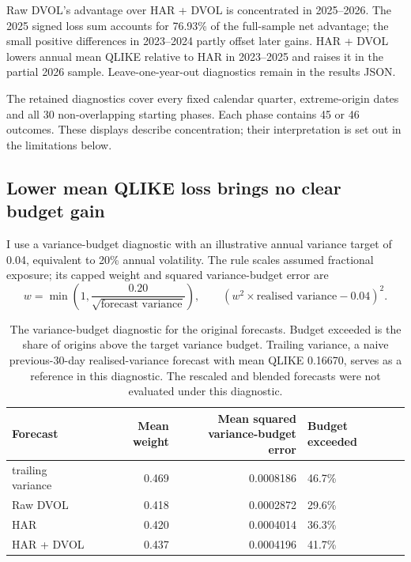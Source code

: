 \documentclass[10pt,a4paper]{article}
\newcommand{\Unit}{1}
\newcommand{\PowerTwo}{2}
\newcommand{\MonthlyDays}{30}
\newcommand{\MeanQLIKETrailing}{0.16670}
\newcommand{\LeaveYearAYear}{2023}
\newcommand{\LeaveYearBYear}{2024}
\newcommand{\LeaveYearCYear}{2025}
\newcommand{\LeaveYearDYear}{2026}
\newcommand{\NonoverlapPhases}{30}
\newcommand{\MinimumPhaseOutcomes}{45}
\newcommand{\MaximumPhaseOutcomes}{46}
\newcommand{\BudgetWeight}{0.20}
\newcommand{\BudgetVariance}{0.04}
\newcommand{\BudgetPercent}{20}
\newcommand{\DecisionTrailingWeight}{0.469}
\newcommand{\DecisionTrailingBudgetError}{0.0008186}
\newcommand{\DecisionTrailingBudgetExceededPercent}{46.7}
\newcommand{\DecisionDvolWeight}{0.418}
\newcommand{\DecisionDvolBudgetError}{0.0002872}
\newcommand{\DecisionDvolBudgetExceededPercent}{29.6}
\newcommand{\DecisionHarWeight}{0.420}
\newcommand{\DecisionHarBudgetError}{0.0004014}
\newcommand{\DecisionHarBudgetExceededPercent}{36.3}
\newcommand{\DecisionHardvolWeight}{0.437}
\newcommand{\DecisionHardvolBudgetError}{0.0004196}
\newcommand{\DecisionHardvolBudgetExceededPercent}{41.7}
\newcommand{\RawGainYearShare}{76.93}
\begin{document}
Raw DVOL's advantage over HAR + DVOL is concentrated in \LeaveYearCYear{}--\LeaveYearDYear{}. The \LeaveYearCYear{} signed loss sum accounts for \RawGainYearShare{}\% of the full-sample net advantage; the small positive differences in \LeaveYearAYear{}--\LeaveYearBYear{} partly offset later gains. HAR + DVOL lowers annual mean QLIKE relative to HAR in \LeaveYearAYear{}--\LeaveYearCYear{} and raises it in the partial \LeaveYearDYear{} sample. Leave-one-year-out diagnostics remain in the results JSON.

The retained diagnostics cover every fixed calendar quarter, extreme-origin dates and all \NonoverlapPhases{} non-overlapping starting phases. Each phase contains \MinimumPhaseOutcomes{} or \MaximumPhaseOutcomes{} outcomes. These displays describe concentration; their interpretation is set out in the limitations below.

\subsection{Lower mean QLIKE loss brings no clear budget gain}

I use a variance-budget diagnostic with an illustrative annual variance target of \BudgetVariance{}, equivalent to \BudgetPercent{}\% annual volatility. The rule scales assumed fractional exposure; its capped weight and squared variance-budget error are
\[
w=\min\!\left(\Unit{},\frac{\BudgetWeight{}}{\sqrt{\text{forecast variance}}}\right),
\qquad
\left(w^{\PowerTwo{}}\times\text{realised variance}-\BudgetVariance{}\right)^{\PowerTwo{}}.
\]

\begin{table}[H]
\centering\small
\caption{The variance-budget diagnostic for the original forecasts. Budget exceeded is the share of origins above the target variance budget. Trailing variance, a naive previous-\MonthlyDays{}-day realised-variance forecast with mean QLIKE \MeanQLIKETrailing{}, serves as a reference in this diagnostic. The rescaled and blended forecasts were not evaluated under this diagnostic.}
\label{tab:budget}
\begin{tabular}{lrrl}
\toprule
Forecast & Mean weight & \shortstack{Mean squared\\variance-budget error} & Budget exceeded \\
\midrule
trailing variance & \DecisionTrailingWeight{} & \DecisionTrailingBudgetError{} & \DecisionTrailingBudgetExceededPercent{}\% \\
Raw DVOL & \DecisionDvolWeight{} & \DecisionDvolBudgetError{} & \DecisionDvolBudgetExceededPercent{}\% \\
HAR & \DecisionHarWeight{} & \DecisionHarBudgetError{} & \DecisionHarBudgetExceededPercent{}\% \\
HAR + DVOL & \DecisionHardvolWeight{} & \DecisionHardvolBudgetError{} & \DecisionHardvolBudgetExceededPercent{}\% \\
\bottomrule
\end{tabular}
\end{table}
\end{document}
